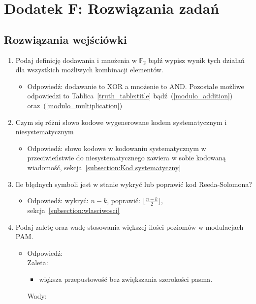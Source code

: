 \setcounter{secnumdepth}{0}
\section*{Dodatek F: Rozwiązania zadań}

\subsection*{Rozwiązania wejściówki}
\begin{enumerate}
    \item Podaj definicję dodawania i mnożenia w $\mathbb{F}_2$ bądź wypisz wynik tych
    działań dla wszystkich możliwych kombinacji elementów.
    \begin{itemize}
        \item Odpowiedź: dodawanie to XOR a mnożenie to AND. Pozostałe możliwe odpowiedzi to Tablica~\ref{truth_table:title} bądź~(\ref{modulo_addition})
        oraz~(\ref{modulo_multiplication})
    \end{itemize}
    \item Czym się różni słowo kodowe wygenerowane kodem systematycznym i niesystematycznym
    \begin{itemize}
        \item Odpowiedź: słowo kodowe w kodowaniu systematycznym w przeciwieństwie do niesystematycznego zawiera w sobie kodowaną wiadomość, sekcja~\ref{subsection:Kod systematyczny}
    \end{itemize}
    \item Ile błędnych symboli jest w stanie wykryć lub poprawić kod Reeda-Solomona?
    \begin{itemize}
        \item Odpowiedź: wykryć: $n-k$, poprawić: $\lfloor \frac{n-k}{2} \rfloor$, sekcja~\ref{subsection:wlasciwosci}
    \end{itemize}
    \item Podaj zaletę oraz wadę stosowania większej ilości poziomów w modulacjach PAM.
    \begin{itemize}
        \item Odpowiedź: \\
        Zaleta:
        \begin{itemize}
            \item większa przepustowość bez zwiększania szerokości pasma.
        \end{itemize}
        Wady:
        \begin{itemize}

\end{itemize}
\end{itemize}
\end{enumerate}
